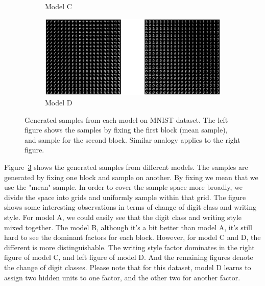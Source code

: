 \begin{figure}
\begin{subfigure}[b]{0.9\textwidth}
    \vspace{-3\baselineskip}
    \caption{Model C}
    \label{fig:us-air}
    \end{subfigure}
    \begin{subfigure}[b]{0.9\textwidth}
    \includegraphics[width=\textwidth]{images/sampleAverage.eps}
    \vspace{-3\baselineskip}
    \caption{Model D}
    \label{fig:us-air}
    \end{subfigure}
    \caption{Generated samples from each model on MNIST dataset. The left figure shows the samples by fixing the first block (mean sample), and sample for the second block. Similar analogy applies to the right figure.}\label{fig:animals}
    \label{fig:MNISTsamples}
\end{figure}

Figure~\ref{fig:MNISTsamples} shows the generated samples from different models. The samples are generated by fixing one block and sample on another. By fixing we mean that we use the "mean" sample. In order to cover the sample space more broadly, we divide the space into grids and uniformly sample within that grid. The figure shows some interesting observations in terms of change of digit class and writing style. For model A, we could easily see that the digit class and writing style mixed together. The model B, although it's a bit better than model A, it's still hard to see the dominant factors for each block. However, for model C and D, the different is more distinguishable. The writing style factor dominates in the right figure of model C, and left figure of model D. And the remaining figures denote the change of digit classes. Please note that for this dataset, model D learns to assign two hidden units to one factor, and the other two for another factor.

\vspace{-0.1cm}
